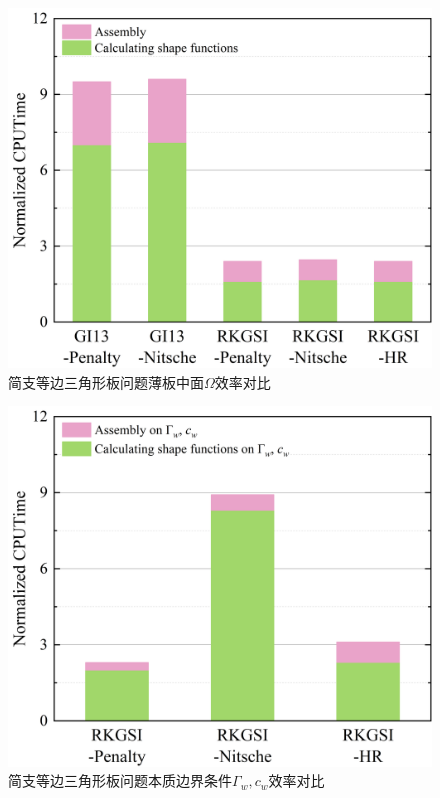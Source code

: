 \begin{figure}[H]
    \centering
    \includegraphics[scale=0.5]{figure/PHR/T/Cefficiencyomega.png}
    \caption{简支等边三角形板问题薄板中面$\Omega$效率对比}\label{Tefficiency1}
\end{figure}
\newpage
\begin{figure}[H]
    \centering
    \includegraphics[scale=0.5]{figure/PHR/T/Cefficiencygamma.png}
    \caption{简支等边三角形板问题本质边界条件$\Gamma_w,c_w$效率对比}\label{Tefficiency2}
\end{figure}
